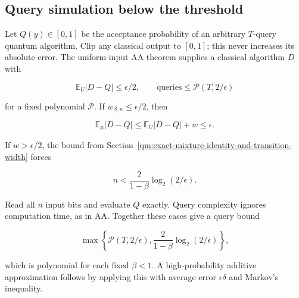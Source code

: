 \subsection{Query simulation below the threshold}\label{qm:query-simulation-below-the-threshold}

Let \(Q(y)\in[0,1]\) be the acceptance probability of an arbitrary \(T\)-query quantum algorithm. Clip any classical output to \([0,1]\); this never increases its absolute error. The uniform-input AA theorem supplies a classical algorithm \(D\) with

\[
\mathbb E_U|D-Q|\le\epsilon/2,\qquad
\text{queries}\le\mathcal P(T,2/\epsilon)
\]

for a fixed polynomial \(\mathcal P\). If \(w_{\beta,n}\le\epsilon/2\), then

\[
\mathbb E_\mu|D-Q|\le\mathbb E_U|D-Q|+w\le\epsilon.
\]

If \(w>\epsilon/2\), the bound from Section~\ref{qm:exact-mixture-identity-and-transition-width} forces

\[
n<\frac{2}{1-\beta}\log_2(2/\epsilon).
\]

Read all \(n\) input bits and evaluate \(Q\) exactly. Query complexity ignores computation time, as in AA. Together these cases give a query bound

\[
\max\left\{\mathcal P(T,2/\epsilon),\frac{2}{1-\beta}\log_2(2/\epsilon)\right\},
\]

which is polynomial for each fixed \(\beta<1\). A high-probability additive approximation follows by applying this with average error \(\epsilon\delta\) and Markov's inequality.
